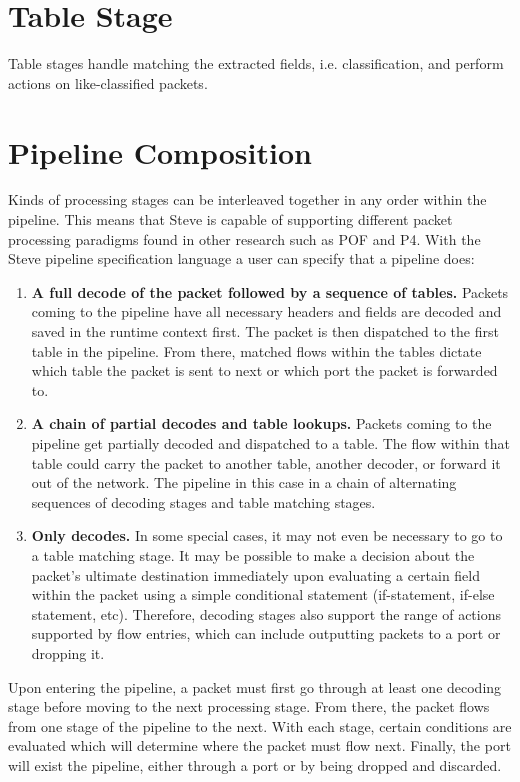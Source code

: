 \section{Table Stage}

Table stages handle matching the extracted fields, i.e. classification, and perform actions on like-classified packets.

\section{Pipeline Composition}

Kinds of processing stages can be interleaved together in any order within the pipeline. This means that Steve is capable of supporting different packet processing paradigms found in other research such as POF and P4. With the Steve pipeline specification language a user can specify that a pipeline does:

\begin{enumerate}
\item \textbf{A full decode of the packet followed by a sequence of tables.} Packets coming to the pipeline have all necessary headers and fields are decoded and saved in the runtime context first. The packet is then dispatched to the first table in the pipeline. From there, matched flows within the tables dictate which table the packet is sent to next or which port the packet is forwarded to.
\item \textbf{A chain of partial decodes and table lookups.} Packets coming to the pipeline get partially decoded and dispatched to a table. The flow within that table could carry the packet to another table, another decoder, or forward it out of the network. The pipeline in this case in a chain of alternating sequences of decoding stages and table matching stages.
\item \textbf{Only decodes.} In some special cases, it may not even be necessary to go to a table matching stage. It may be possible to make a decision about the packet’s ultimate destination immediately upon evaluating a certain field within the packet using a simple conditional statement (if-statement, if-else statement, etc). Therefore, decoding stages also support the range of actions supported by flow entries, which can include outputting packets to a port or dropping it.
\end{enumerate}

Upon entering the pipeline, a packet must first go through at least one decoding stage before moving to the next processing stage. From there, the packet flows from one stage of the pipeline to the next. With each stage, certain conditions are evaluated which will determine where the packet must flow next. Finally, the port will exist the pipeline, either through a port or by being dropped and discarded.

